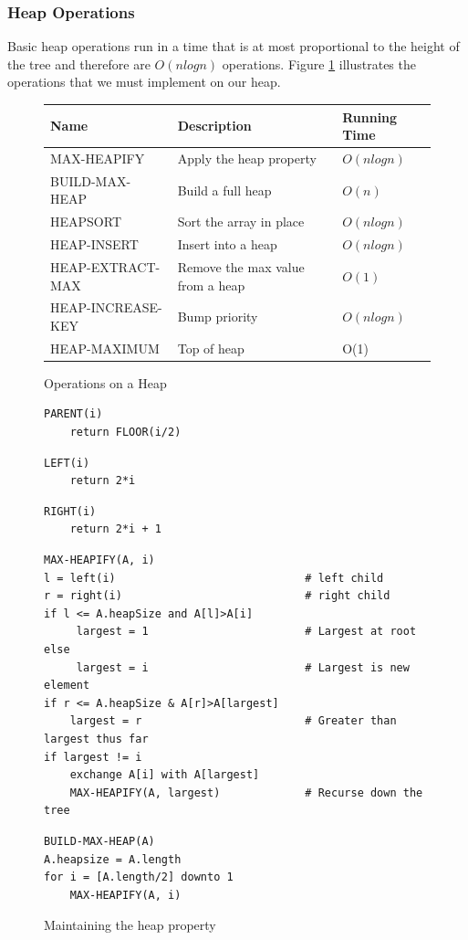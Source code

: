 \documentclass[10pt,a4paper]{article}
\begin{document}
\subsubsection{Heap Operations}
Basic heap operations run in a time that is at most proportional to the height of the tree and therefore are $O(n log n)$ operations. Figure \ref{heapops} illustrates the operations that we must implement on our heap. 
\begin{figure}
\caption{Operations on a Heap}
\begin{center}
\begin{tabular}{| l | l | l | }
\hline 
Name & Description & Running Time  \\
\hline
MAX-HEAPIFY & Apply the heap property & $O(n log n)$ \\
BUILD-MAX-HEAP & Build a full heap & $O(n)$ \\
HEAPSORT & Sort the array in place & $O(n log n)$ \\
HEAP-INSERT & Insert into a heap & $O(n log n)$ \\
HEAP-EXTRACT-MAX & Remove the max value from a heap & $O(1)$ \\
HEAP-INCREASE-KEY & Bump priority & $O(n log n)$  \\
HEAP-MAXIMUM & Top of heap & O(1) \\
\hline
\end{tabular}
\label{heapops}
\end{center}
\end{figure}
\begin{figure}
\caption{Maintaining the heap property}
\begin{center}

\begin{lstlisting}
PARENT(i)
	return FLOOR(i/2)
\end{lstlisting}
	
\begin{lstlisting}
LEFT(i)
	return 2*i
\end{lstlisting}

\begin{lstlisting}
RIGHT(i)
	return 2*i + 1
\end{lstlisting}

\begin{lstlisting}
MAX-HEAPIFY(A, i)
l = left(i)								# left child	
r = right(i)							# right child
if l <= A.heapSize and A[l]>A[i] 	
     largest = 1						# Largest at root
else 
	 largest = i						# Largest is new element
if r <= A.heapSize & A[r]>A[largest]
	largest = r							# Greater than largest thus far
if largest != i					
	exchange A[i] with A[largest]			
	MAX-HEAPIFY(A, largest)				# Recurse down the tree
\end{lstlisting}


\begin{lstlisting}
BUILD-MAX-HEAP(A)
A.heapsize = A.length 
for i = [A.length/2] downto 1
	MAX-HEAPIFY(A, i) 
\end{lstlisting}

\label{heapify}
\end{center}
\end{figure}
\end{document}
